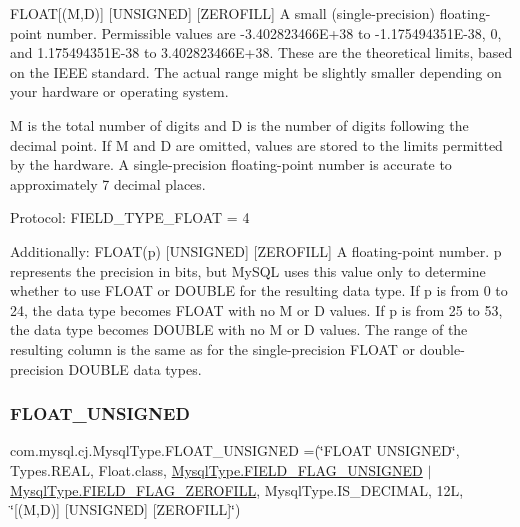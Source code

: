 F\+L\+O\+AT\mbox{[}(M,D)\mbox{]} \mbox{[}U\+N\+S\+I\+G\+N\+ED\mbox{]} \mbox{[}Z\+E\+R\+O\+F\+I\+LL\mbox{]} A small (single-\/precision) floating-\/point number. Permissible values are -\/3.\+402823466E+38 to -\/1.\+175494351E-\/38, 0, and 1.\+175494351E-\/38 to 3.\+402823466E+38. These are the theoretical limits, based on the I\+E\+EE standard. The actual range might be slightly smaller depending on your hardware or operating system.

M is the total number of digits and D is the number of digits following the decimal point. If M and D are omitted, values are stored to the limits permitted by the hardware. A single-\/precision floating-\/point number is accurate to approximately 7 decimal places.

Protocol\+: F\+I\+E\+L\+D\+\_\+\+T\+Y\+P\+E\+\_\+\+F\+L\+O\+AT = 4

Additionally\+: F\+L\+O\+A\+T(p) \mbox{[}U\+N\+S\+I\+G\+N\+ED\mbox{]} \mbox{[}Z\+E\+R\+O\+F\+I\+LL\mbox{]} A floating-\/point number. p represents the precision in bits, but My\+S\+QL uses this value only to determine whether to use F\+L\+O\+AT or D\+O\+U\+B\+LE for the resulting data type. If p is from 0 to 24, the data type becomes F\+L\+O\+AT with no M or D values. If p is from 25 to 53, the data type becomes D\+O\+U\+B\+LE with no M or D values. The range of the resulting column is the same as for the single-\/precision F\+L\+O\+AT or double-\/precision D\+O\+U\+B\+LE data types. \mbox{\label{enumcom_1_1mysql_1_1cj_1_1_mysql_type_a095a818e7723ff0543eaed09f06694fa}} 
\subsubsection{\texorpdfstring{F\+L\+O\+A\+T\+\_\+\+U\+N\+S\+I\+G\+N\+ED}{FLOAT\_UNSIGNED}}
{\footnotesize\ttfamily com.\+mysql.\+cj.\+Mysql\+Type.\+F\+L\+O\+A\+T\+\_\+\+U\+N\+S\+I\+G\+N\+ED =(\char`\"{}F\+L\+O\+AT U\+N\+S\+I\+G\+N\+ED\char`\"{}, Types.\+R\+E\+AL, Float.\+class, \mbox{\hyperlink{enumcom_1_1mysql_1_1cj_1_1_mysql_type_a2c6701614559b1ad9955cdc4ca6337e2}{Mysql\+Type.\+F\+I\+E\+L\+D\+\_\+\+F\+L\+A\+G\+\_\+\+U\+N\+S\+I\+G\+N\+ED}} $\vert$ \mbox{\hyperlink{enumcom_1_1mysql_1_1cj_1_1_mysql_type_abb76a1f2f3dac9a30d1b559b8ba66a48}{Mysql\+Type.\+F\+I\+E\+L\+D\+\_\+\+F\+L\+A\+G\+\_\+\+Z\+E\+R\+O\+F\+I\+LL}}, Mysql\+Type.\+I\+S\+\_\+\+D\+E\+C\+I\+M\+AL, 12\+L, \char`\"{}\mbox{[}(\+M,\+D)\mbox{]} \mbox{[}\+U\+N\+S\+I\+G\+N\+E\+D\mbox{]} \mbox{[}\+Z\+E\+R\+O\+F\+I\+L\+L\mbox{]}\char`\"{})}

